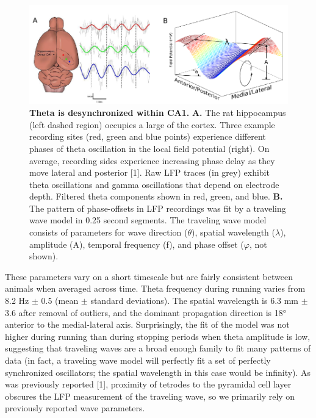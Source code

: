 \documentclass[]{article}
\begin{document}
\begin{figure}[htbp]
\centering
\includegraphics{./finalFigs/brainAndModel.png}
\caption{\textbf{Theta is desynchronized within CA1.} \textbf{A.} The
rat hippocampus (left dashed region) occupies a large of the cortex.
Three example recording sites (red, green and blue points) experience
different phases of theta oscillation in the local field potential
(right). On average, recording sides experience increasing phase delay
as they move lateral and posterior {[}1{]}. Raw LFP traces (in grey)
exhibit theta oscillations and gamma oscillations that depend on
electrode depth. Filtered theta components shown in red, green, and
blue. \textbf{B.} The pattern of phase-offsets in LFP recordings was fit
by a traveling wave model in 0.25 second segments. The traveling wave
model consists of parameters for wave direction (\(\theta\)), spatial
wavelength (\(\lambda\)), amplitude (A), temporal frequency (f), and
phase offset (\(\varphi\), not shown).}
\end{figure}

These parameters vary on a short timescale but are fairly consistent
between animals when averaged across time. Theta frequency during
running varies from 8.2 Hz \(\pm\) 0.5 (mean \(\pm\) standard
deviations). The spatial wavelength is 6.3 mm \(\pm\) 3.6 after removal
of outliers, and the dominant propagation direction is 18° anterior to
the medial-lateral axis. Surprisingly, the fit of the model was not
higher during running than during stopping periods when theta amplitude
is low, suggesting that traveling waves are a broad enough family to fit
many patterns of data (in fact, a traveling wave model will perfectly
fit a set of perfectly synchronized oscillators; the spatial wavelength
in this case would be infinity). As was previously reported {[}1{]},
proximity of tetrodes to the pyramidal cell layer obscures the LFP
measurement of the traveling wave, so we primarily rely on previously
reported wave parameters.
\end{document}
